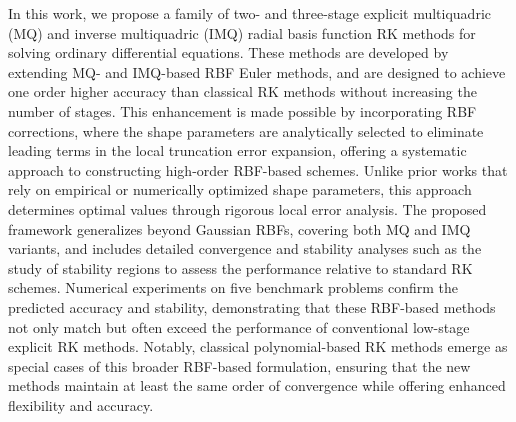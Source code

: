 \documentclass[a4paper, preprint,11pt]{elsarticle}
\numberwithin{equation}{section}
\begin{document}
In this work, we propose a family of two- and three-stage explicit multiquadric (MQ) and inverse multiquadric (IMQ) radial basis function  RK methods for solving ordinary differential equations. These methods are developed by extending MQ- and IMQ-based RBF Euler methods, and are designed to achieve one order higher accuracy than classical RK methods without increasing the number of stages. This enhancement is made possible by incorporating RBF corrections, where the shape parameters are analytically selected to eliminate leading terms in the local truncation error expansion, offering a systematic approach to constructing high-order RBF-based schemes. Unlike prior works \cite{fasshauer2007choosing,fornberg2004some,  schaback1995error} that rely on empirical or numerically optimized shape parameters, this approach determines optimal values through rigorous local error analysis. The proposed framework generalizes beyond Gaussian RBFs, covering both MQ and IMQ variants, and includes detailed convergence and stability analyses such as the study of stability regions to assess the performance relative to standard RK schemes. Numerical experiments on five benchmark problems confirm the predicted accuracy and stability, demonstrating that these RBF-based methods not only match but often exceed the performance of conventional low-stage explicit RK methods. Notably, classical polynomial-based RK methods emerge as special cases of this broader RBF-based formulation, ensuring that the new methods maintain at least the same order of convergence while offering enhanced flexibility and accuracy.


\end{document}
